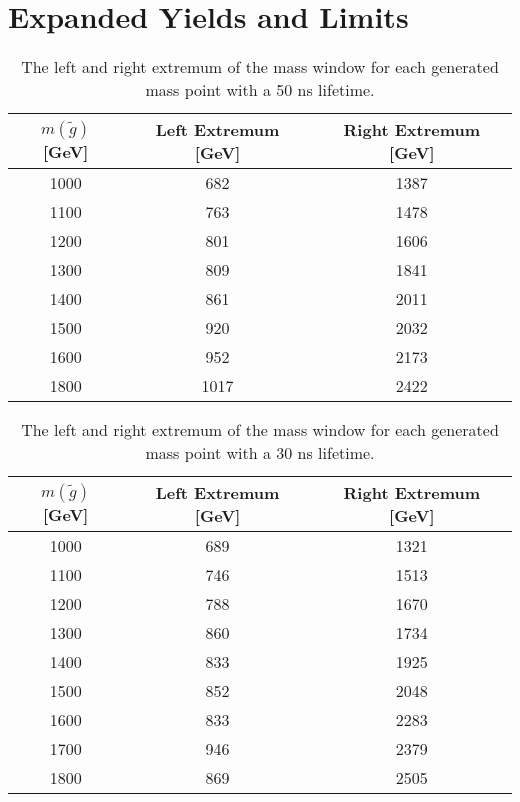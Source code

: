 \chapter{Expanded \rhadron Yields and Limits}

\label{app:yields}

\begin{table}[!htbp]
  \begin{center}
    \begin{tabular}{ccc}
      \hline
      $m(\tilde{g})$ [GeV]  & Left Extremum [GeV] & Right Extremum [GeV] \\
      \hline
      1000    & 682 & 1387 \\
      1100    & 763 & 1478 \\
      1200    & 801 & 1606 \\
      1300    & 809 & 1841 \\
      1400    & 861 & 2011 \\
      1500    & 920 & 2032 \\
      1600    & 952 & 2173 \\
      1800    & 1017 & 2422 \\
      \hline
    \end{tabular}
  \end{center}
  \caption{The left and right extremum of the mass window for each generated mass point with a 50 ns lifetime.}
  \label{tab:app_window_50ns}
\end{table}

\begin{table}[!htbp]
  \begin{center}
    \begin{tabular}{ccc}
        \hline
        $m(\tilde{g})$ [GeV]  & Left Extremum [GeV] & Right Extremum [GeV] \\
        \hline
        1000    & 689 & 1321 \\
        1100    & 746 & 1513 \\
        1200    & 788 & 1670 \\
        1300    & 860 & 1734 \\
        1400    & 833 & 1925 \\
        1500    & 852 & 2048 \\
        1600    & 833 & 2283 \\
        1700    & 946 & 2379 \\
        1800    & 869 & 2505 \\
        \hline
    \end{tabular}
  \end{center}
  \caption{The left and right extremum of the mass window for each generated mass point with a 30 ns lifetime.}
  \label{tab:app_window_30ns}
\end{table}

